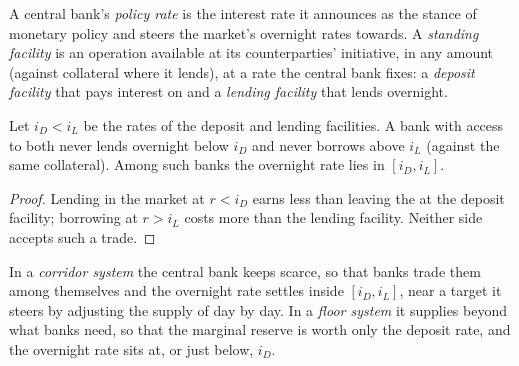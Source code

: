 \begin{definition}\label{def:m2:central-banks-and-the-short-rate:policy}
A central bank's \emph{policy rate} is the interest rate
it announces as the stance of monetary policy and steers the market's
overnight rates towards. A \emph{standing facility}
is an operation available at its counterparties' initiative, in any amount
(against collateral where it lends), at a rate the central bank fixes: a
\emph{deposit facility} that pays interest on  and a \emph{lending
facility} that lends  overnight.
\end{definition}

\begin{proposition}\label{prop:m2:central-banks-and-the-short-rate:bounds}
Let $i_D < i_L$ be the rates of the deposit and lending facilities. A bank
with access to both never lends  overnight below $i_D$ and never
borrows above $i_L$ (against the same collateral). Among such banks the
overnight rate lies in $[i_D, i_L]$.
\end{proposition}
\begin{proof}
Lending in the market at $r < i_D$ earns less than leaving the  at
the deposit facility; borrowing at $r > i_L$ costs more than the lending
facility. Neither side accepts such a trade.
\end{proof}

\begin{definition}\label{def:m2:central-banks-and-the-short-rate:corridor}
In a \emph{corridor system} the central bank keeps
 scarce, so that banks trade them among themselves and the overnight
rate settles inside $[i_D, i_L]$, near a target it steers by adjusting the
supply of  day by day. In a \emph{floor system}
it supplies  beyond what banks need, so that the marginal reserve is
worth only the deposit rate, and the overnight rate sits at, or just below,
$i_D$.
\end{definition}

